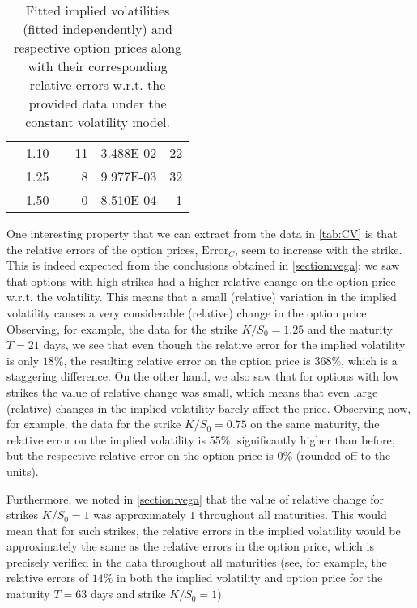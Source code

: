 \begin{table}[H]
\begin{tabular}{@{}cccrcr@{}}
 & 1.10 &  & 11 & \num{3.488E-02} & 22 \\
 & 1.25 &  & 8 & \num{9.977E-03} & 32 \\
 & 1.50 &  & 0 & \num{8.510E-04} & 1 \\ \bottomrule
\end{tabular}
  \caption[Fitted implied volatilities (fitted independently) and respective option prices along with their corresponding relative errors w.r.t. the provided data under the constant volatility model.]{Fitted implied volatilities (fitted independently) and respective option prices along with their corresponding relative errors w.r.t. the provided data under the constant volatility model.}
  \label{tab:CV}
\end{table}

One interesting property that we can extract from the data in \autoref{tab:CV} is that the relative errors of the option prices, $\mathrm{Error}_{C}$, seem to increase with the strike. This is indeed expected from the conclusions obtained in \autoref{section:vega}: we saw that options with high strikes had a higher relative change on the option price w.r.t. the volatility. This means that a small (relative) variation in the implied volatility causes a very considerable (relative) change in the option price. Observing, for example, the data for the strike $K/S_0=1.25$ and the maturity $T=21$ days, we see that even though the relative error for the implied volatility is only $18\%$, the resulting relative error on the option price is $368\%$, which is a staggering difference. On the other hand, we also saw that for options with low strikes the value of relative change was small, which means that even large (relative) changes in the implied volatility barely affect the price. Observing now, for example, the data for the strike $K/S_0=0.75$ on the same maturity, the relative error on the implied volatility is $55\%$, significantly higher than before, but the respective relative error on the option price is $0\%$ (rounded off to the units).

Furthermore, we noted in \autoref{section:vega} that the value of relative change for strikes $K/S_0=1$ was approximately $1$ throughout all maturities. This would mean that for such strikes, the relative errors in the implied volatility would be approximately the same as the relative errors in the option price, which is precisely verified in the data throughout all maturities (see, for example, the relative errors of $14\%$ in both the implied volatility and option price for the maturity $T=63$ days and strike $K/S_0=1$).


